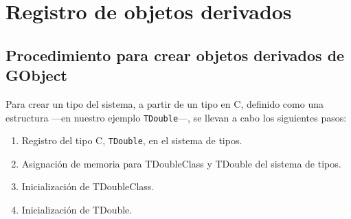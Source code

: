 %

\section{Registro de objetos derivados}
\subsection{Procedimiento para crear objetos derivados de \textsf{GObject}}
Para crear un tipo del sistema, a partir de un tipo en C, definido como una estructura ---en nuestro
ejemplo \texttt{TDouble}---, se llevan a cabo los siguientes pasos:
\begin{enumerate}
  \tightlist
\item Registro del tipo C, \texttt{TDouble}, en el sistema de tipos.
\item Asignación de memoria para \textsf{TDoubleClass} y \textsf{TDouble} del sistema de tipos.
\item Inicialización de \textsf{TDoubleClass}.
\item Inicialización de \textsf{TDouble}.
\end{enumerate}

